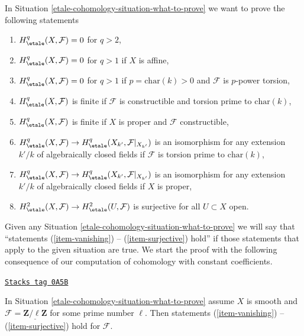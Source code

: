 In Situation \ref{etale-cohomology-situation-what-to-prove}
we want to prove the following statements
\begin{enumerate}
\item
\label{etale-cohomology-item-vanishing}
$H^q_\etale(X, \mathcal{F}) = 0$ for $q > 2$,
\item
\label{etale-cohomology-item-vanishing-affine}
$H^q_\etale(X, \mathcal{F}) = 0$ for $q > 1$ if $X$ is affine,
\item
\label{etale-cohomology-item-vanishing-p-p}
$H^q_\etale(X, \mathcal{F}) = 0$ for $q > 1$ if $p = \text{char}(k) > 0$
and $\mathcal{F}$ is $p$-power torsion,
\item
\label{etale-cohomology-item-finite-prime-to-p}
$H^q_\etale(X, \mathcal{F})$ is finite if $\mathcal{F}$ is
constructible and torsion prime to $\text{char}(k)$,
\item
\label{etale-cohomology-item-finite-proper}
$H^q_\etale(X, \mathcal{F})$ is finite if $X$ is proper and
$\mathcal{F}$ constructible,
\item
\label{etale-cohomology-item-base-change-prime-to-p}
$H^q_\etale(X, \mathcal{F}) \to
H^q_\etale(X_{k'}, \mathcal{F}|_{X_{k'}})$ is an isomorphism
for any extension $k'/k$ of algebraically closed fields
if $\mathcal{F}$ is torsion prime to $\text{char}(k)$,
\item
\label{etale-cohomology-item-base-change-proper}
$H^q_\etale(X, \mathcal{F}) \to
H^q_\etale(X_{k'}, \mathcal{F}|_{X_{k'}})$ is an isomorphism
for any extension $k'/k$ of algebraically closed fields
if $X$ is proper,
\item
\label{etale-cohomology-item-surjective}
$H^2_\etale(X, \mathcal{F}) \to H^2_\etale(U, \mathcal{F})$
is surjective for all $U \subset X$ open.
\end{enumerate}
Given any Situation \ref{etale-cohomology-situation-what-to-prove}
we will say that
``statements (\ref{item-vanishing}) -- (\ref{item-surjective}) hold''
if those statements that apply to the given situation are true.
We start the proof with the following consequence of our computation
of cohomology with constant coefficients.

\begin{lemma}
\label{etale-cohomology-lemma-constant-smooth-statements}
\href{https://stacks.math.columbia.edu/tag/0A5B}{\texttt{Stacks tag 0A5B}}

In Situation \ref{etale-cohomology-situation-what-to-prove}
assume $X$ is smooth and $\mathcal{F} = \underline{\mathbf{Z}/\ell\mathbf{Z}}$
for some prime number $\ell$. Then statements
(\ref{item-vanishing}) -- (\ref{item-surjective}) hold
for $\mathcal{F}$.
\end{lemma}

